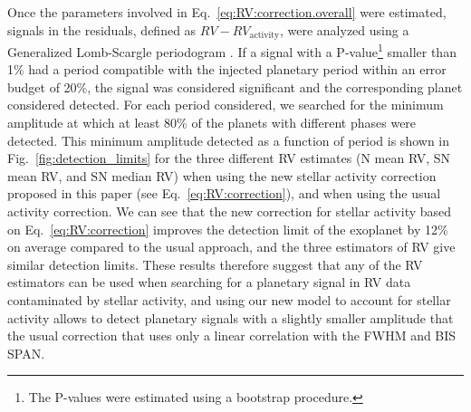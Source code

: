 \documentclass{aa}
\newcommand{\jessi}[1]{{\color{Purple}[[\textbf{Jessi: }#1]]}}
\begin{document}
%

Once the parameters involved in Eq.~\eqref{eq:RV:correction.overall} were estimated,  signals in the residuals, defined as $RV - RV_{\text{activity}}$, were analyzed using a Generalized Lomb-Scargle periodogram \citep[][]{Lomb-1976a, Scargle-1982, Zechmeister-2009}. 
If a signal with a P-value\footnote{The P-values were estimated using a bootstrap procedure.} smaller than 1\% had a period compatible with the injected planetary period within an error budget of 20\%, the signal was considered significant and the corresponding planet considered detected.  
For each period considered, we searched for the minimum amplitude at which at least 80\% of the planets with different phases were detected.
This minimum amplitude detected as a function of period is shown in Fig.~\ref{fig:detection_limits} for the three different RV estimates (N mean RV, SN mean RV, and SN median RV) when using the new stellar activity correction proposed in this paper (see Eq.~\eqref{eq:RV:correction}), and when using the usual activity correction.
We can see that the new correction for stellar activity based on Eq.~\eqref{eq:RV:correction} improves the detection limit of the exoplanet by 12\% on average compared to the usual approach, and the three estimators of RV give similar detection limits.
These results therefore suggest that any of the RV estimators can be used when searching for a planetary signal in RV data contaminated by stellar activity, and using our new model to account for stellar activity allows to detect planetary signals with a slightly smaller amplitude that the usual correction that uses only a linear correlation with the FWHM and BIS SPAN.
\end{document}
